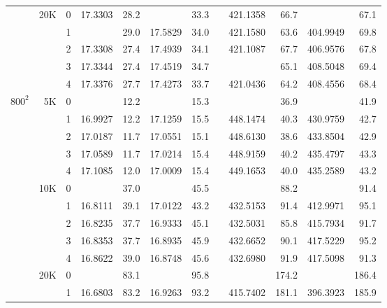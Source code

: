 \begin{table}[p!]
{\begin{tabular*}{\hsize}{crrd{4}rd{4}rld{4}rd{4}r}
        & 20K & 0 &      17.3303  & 28.2 &  & 33.3 &  &      421.1358  &  66.7 &  &  67.1 \\
        &     & 1 &  & 29.0 &      17.5829  & 34.0 &  &      421.1580  &  63.6 &      404.9949  &  69.8 \\
        &     & 2 &      17.3308  & 27.4 &      17.4939  & 34.1 &  &      421.1087  &  67.7 &      406.9576  &  67.8 \\
        &     & 3 &      17.3344  & 27.4 &      17.4519  & 34.7 &  &  &  65.1 &      408.5048  &  69.4 \\
        &     & 4 &      17.3376  & 27.7 &      17.4273  & 33.7 &  &      421.0436  &  64.2 &      408.4556  &  68.4 \\
\hline
$800^2$ &  5K & 0 &  & 12.2 &  & 15.3 &  &  &  36.9 &  &  41.9 \\
        &     & 1 &      16.9927  & 12.2 &      17.1259  & 15.5 &  &      448.1474  &  40.3 &      430.9759  &  42.7 \\
        &     & 2 &      17.0187  & 11.7 &      17.0551  & 15.1 &  &      448.6130  &  38.6 &      433.8504  &  42.9 \\
        &     & 3 &      17.0589  & 11.7 &      17.0214  & 15.4 &  &      448.9159  &  40.2 &      435.4797  &  43.3 \\
        &     & 4 &      17.1085  & 12.0 &      17.0009  & 15.4 &  &      449.1653  &  40.0 &      435.2589  &  43.2 \\
        & 10K & 0 &  & 37.0 &  & 45.5 &  &  &  88.2 &  &  91.4 \\
        &     & 1 &      16.8111  & 39.1 &      17.0122  & 43.2 &  &      432.5153  &  91.4 &      412.9971  &  95.1 \\
        &     & 2 &      16.8235  & 37.7 &      16.9333  & 45.1 &  &      432.5031  &  85.8 &      415.7934  &  91.7 \\
        &     & 3 &      16.8353  & 37.7 &      16.8935  & 45.9 &  &      432.6652  &  90.1 &      417.5229  &  95.2 \\
        &     & 4 &      16.8622  & 39.0 &      16.8748  & 45.6 &  &      432.6980  &  91.9 &      417.5098  &  91.3 \\
        & 20K & 0 &  & 83.1 &  & 95.8 &  &  & 174.2 &  & 186.4 \\
        &     & 1 &      16.6803  & 83.2 &      16.9263  & 93.2 &  &      415.7402  & 181.1 &      396.3923  & 185.9 \\

\end{tabular*}}
\end{table}
